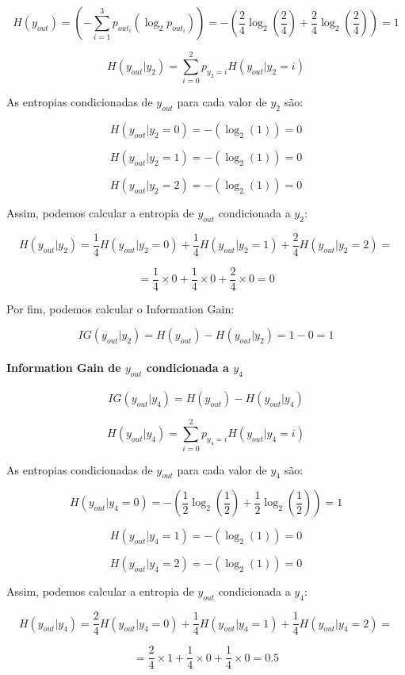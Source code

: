 \documentclass{article}
\begin{document}
\[ H(y_{out}) = \left(- \sum_{i=1}^{3} p_{out_i} (\log_2 p_{out_i})\right) = - \left( \frac{2}{4} \log_2 \left( \frac{2}{4} \right) + \frac{2}{4} \log_2 \left( \frac{2}{4} \right) \right) = 1 \]

\[ H(y_{out}|y_2) = \sum_{i=0}^{2} p_{y_2 = i} H(y_{out}|y_2 = i) \]

As entropias condicionadas de $y_{out}$ para cada valor de $y_2$ são:

\[ H(y_{out}|y_2 = 0) = - \left( \log_2(1) \right) = 0 \]

\[ H(y_{out}|y_2 = 1) = - \left( \log_2(1) \right) = 0 \]

\[ H(y_{out}|y_2 = 2) = - \left( \log_2(1) \right) = 0 \]

Assim, podemos calcular a entropia de $y_{out}$ condicionada a $y_2$:

\[ H(y_{out}|y_2) = \frac{1}{4} H(y_{out}|y_2 = 0) + \frac{1}{4} H(y_{out}|y_2 = 1) + \frac{2}{4} H(y_{out}|y_2 = 2) = \]

\[ = \frac{1}{4} \times 0 + \frac{1}{4} \times 0 + \frac{2}{4} \times 0 = 0 \]

Por fim, podemos calcular o Information Gain:

\[ IG(y_{out}|y_2) = H(y_{out}) - H(y_{out}|y_2) = 1 - 0 = 1 \]

\paragraph{Information Gain de $y_{out}$ condicionada a $y_4$}

\[ IG(y_{out}|y_4) = H(y_{out}) - H(y_{out}|y_4) \]

\[ H(y_{out}|y_4) = \sum_{i=0}^{2} p_{y_4 = i} H(y_{out}|y_4 = i) \]

As entropias condicionadas de $y_{out}$ para cada valor de $y_4$ são:

\[ H(y_{out}|y_4 = 0) = - \left( \frac{1}{2} \log_2 \left( \frac{1}{2} \right) + \frac{1}{2} \log_2 \left( \frac{1}{2} \right) \right) = 1 \]

\[ H(y_{out}|y_4 = 1) = - \left( \log_2(1) \right) = 0 \]

\[ H(y_{out}|y_4 = 2) = - \left( \log_2(1) \right) = 0 \]

Assim, podemos calcular a entropia de $y_{out}$ condicionada a $y_4$:

\[ H(y_{out}|y_4) = \frac{2}{4} H(y_{out}|y_4 = 0) + \frac{1}{4} H(y_{out}|y_4 = 1) + \frac{1}{4} H(y_{out}|y_4 = 2) = \]

\[ = \frac{2}{4} \times 1 + \frac{1}{4} \times 0 + \frac{1}{4} \times 0 = 0.5 \]
\end{document}
